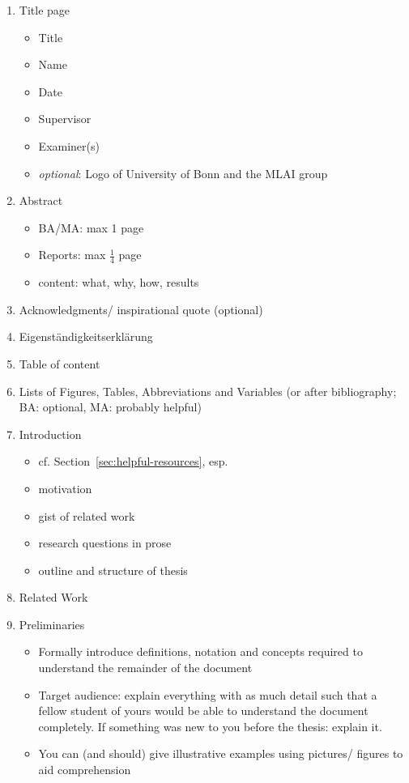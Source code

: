 \documentclass[nodate]{proc}
\begin{document}
\begin{enumerate}
	\item Title page
		\begin{itemize}
			\item Title
			\item Name
			\item Date
			\item Supervisor
			\item Examiner(s)
			\item \emph{optional}: Logo of University of Bonn and the MLAI group
		\end{itemize}
	\item Abstract
		\begin{itemize}
			\item BA/MA: max 1 page
			\item Reports: max $\frac{1}{4}$ page
			\item content: what, why, how, results
		\end{itemize}
	\item Acknowledgments/ inspirational quote (optional)
	\item Eigenständigkeitserklärung
	\item Table of content
	\item Lists of Figures, Tables, Abbreviations and Variables (or after bibliography; BA: optional, MA: probably helpful)
	\item Introduction
		\begin{itemize}
			\item cf. Section~\ref{sec:helpful-resources}, esp. \cite{zobel_writing}
			\item motivation
			\item gist of related work
			\item research questions in prose
			\item outline and structure of thesis
		\end{itemize}
	\item Related Work
	\item Preliminaries
		\begin{itemize}
			\item Formally introduce definitions, notation and concepts required to understand the remainder of the document
			\item Target audience: explain everything with as much detail such that a fellow student of yours would be able to understand the document completely. If something was new to you before the thesis: explain it.
			\item You can (and should) give illustrative examples using pictures/ figures to aid comprehension

\end{itemize}
\end{enumerate}
\end{document}
